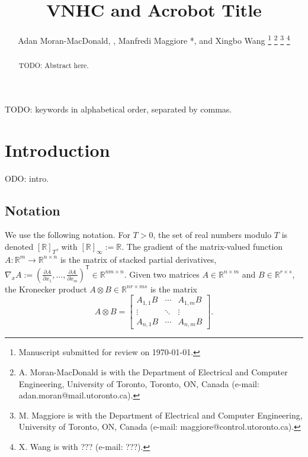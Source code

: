\documentclass[journal,twoside,web]{ieeecolor}
\newcommand*{\Title}{VNHC and Acrobot Title}
\newcommand*{\tpose}{^\mathsf{T}}
\newcommand*{\Rt}[1]{[\R]_{#1}}
\newcommand*{\R}{\mathbb{R}}
\newcommand*{\pdiff}[2]{\frac{\partial #1}{\partial #2}}
\begin{document}
\title{\Title}
\author{Adan Moran-MacDonald, , Manfredi Maggiore
*, and Xingbo Wang
\thanks{Manuscript submitted for review on \today.}
\thanks{A. Moran-MacDonald is with the Department of Electrical and Computer
    Engineering, University of Toronto, Toronto, ON, Canada (e-mail:
adan.moran@mail.utoronto.ca).}
\thanks{M. Maggiore is with the Department of Electrical and Computer
Engineering, University of Toronto, ON, Canada (e-mail:
maggiore@control.utoronto.ca).}
\thanks{X. Wang is with ??? (e-mail: ???).}
} %

\maketitle

\begin{abstract}
TODO: Abstract here.
\end{abstract}

\begin{IEEEkeywords}
TODO: keywords in alphabetical order, separated by commas.
\end{IEEEkeywords}

\section{Introduction}\label{sec:introduction}
ODO: intro.

\subsection{Notation}
We use the following notation.
For \(T > 0\), the set of real numbers modulo \(T\) is denoted \(\Rt{T}\), with
\(\Rt{\infty} := \R\).
The gradient of the matrix-valued function 
\(A : \R^m \rightarrow \R^{n\times n}\) is the matrix of stacked partial
derivatives, 
\(\nabla_xA := (\pdiff{A}{x_1},\ldots,\pdiff{A}{x_m})\tpose \in \R^{nm \times n}\).
Given two matrices \(A \in \R^{n \times m}\) and \(B \in \R^{r \times s}\), the
Kronecker product \cite{kronprod} \(A \otimes B \in \R^{nr \times ms}\) is the
matrix
\[
    A \otimes B = \begin{bmatrix}
        A_{1,1}B & \cdots & A_{1,m} B \\
        \vdots & \ddots & \vdots \\
        A_{n,1} B & \cdots & A_{n,m} B
    \end{bmatrix} 
    .
\]
\end{document}
